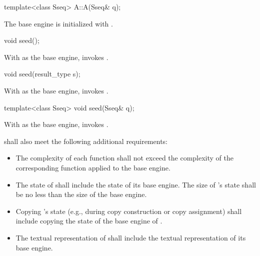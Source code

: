 \begin{itemdecl}
template<class Sseq> A::A(Sseq& q);
\end{itemdecl}

\begin{itemdescr}
\pnum
\effects
 The base engine is initialized
 with .
\end{itemdescr}

\begin{itemdecl}
void seed();
\end{itemdecl}

\begin{itemdescr}
\pnum
\effects
 With  as the base engine, invokes .
\end{itemdescr}

\begin{itemdecl}
void seed(result_type s);
\end{itemdecl}

\begin{itemdescr}
\pnum
\effects
 With  as the base engine, invokes .
\end{itemdescr}

\begin{itemdecl}
template<class Sseq> void seed(Sseq& q);
\end{itemdecl}

\begin{itemdescr}
\pnum
\effects
 With  as the base engine, invokes .
\end{itemdescr}

\pnum
{} shall also meet
the following additional requirements:
\begin{itemize}
 \item
   The complexity
   of each function
   shall not exceed the complexity
   of the corresponding function
   applied to the base engine.
 \item
   The state
   of 
   shall include the state
   of its base engine.
   The size of 's state
   shall be no less than the size of the base engine.
 \item
   Copying 's state
   (e.g., during copy construction or copy assignment)
   shall include copying
   the state of the base engine of .
 \item
   The textual representation
   of 
   shall include
   the textual representation of its base engine.
\end{itemize}

